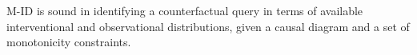 M-ID is sound in identifying a counterfactual query in terms of available interventional and observational distributions, given a causal diagram and a set of monotonicity constraints.
